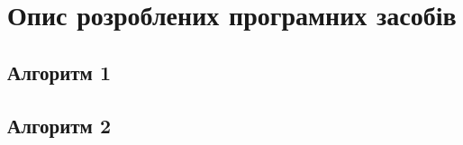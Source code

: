 \newpage
\section{Опис розроблених програмних засобів}
\subsection{Алгоритм 1}
\subsection{Алгоритм 2}
